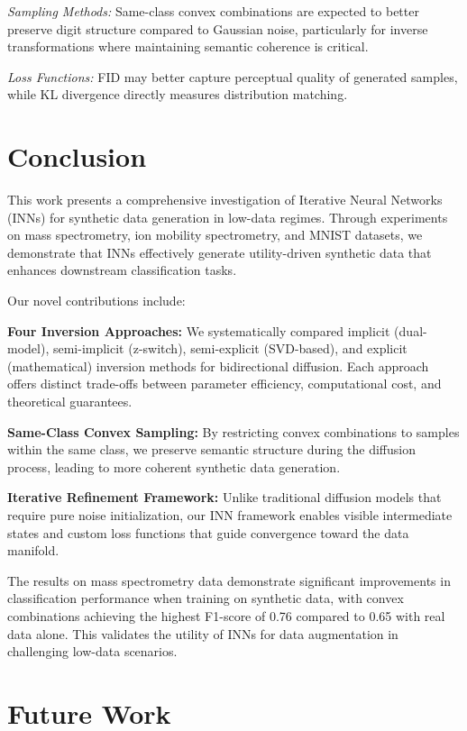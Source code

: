 \documentclass[sigconf]{acmart}
\begin{document}
\textit{Sampling Methods:} Same-class convex combinations are expected to better preserve digit structure compared to Gaussian noise, particularly for inverse transformations where maintaining semantic coherence is critical.

\textit{Loss Functions:} FID may better capture perceptual quality of generated samples, while KL divergence directly measures distribution matching.

\section{Conclusion}

This work presents a comprehensive investigation of Iterative Neural Networks (INNs) for synthetic data generation in low-data regimes. Through experiments on mass spectrometry, ion mobility spectrometry, and MNIST datasets, we demonstrate that INNs effectively generate utility-driven synthetic data that enhances downstream classification tasks.

Our novel contributions include:

\textbf{Four Inversion Approaches:} We systematically compared implicit (dual-model), semi-implicit (z-switch), semi-explicit (SVD-based), and explicit (mathematical) inversion methods for bidirectional diffusion. Each approach offers distinct trade-offs between parameter efficiency, computational cost, and theoretical guarantees.

\textbf{Same-Class Convex Sampling:} By restricting convex combinations to samples within the same class, we preserve semantic structure during the diffusion process, leading to more coherent synthetic data generation.

\textbf{Iterative Refinement Framework:} Unlike traditional diffusion models that require pure noise initialization, our INN framework enables visible intermediate states and custom loss functions that guide convergence toward the data manifold.

The results on mass spectrometry data demonstrate significant improvements in classification performance when training on synthetic data, with convex combinations achieving the highest F1-score of 0.76 compared to 0.65 with real data alone. This validates the utility of INNs for data augmentation in challenging low-data scenarios.

\section{Future Work}
\end{document}
